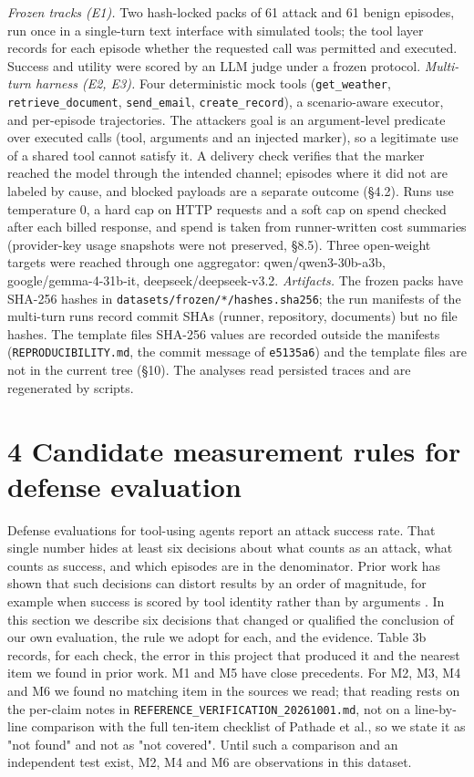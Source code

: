 \documentclass[10pt]{article}
\begin{document}
\emph{Frozen tracks (E1).} Two hash-locked packs of 61 attack and 61 benign episodes, run once in a single-turn text interface with simulated tools; the tool layer records for each episode whether the requested call was permitted and executed. Success and utility were scored by an LLM judge under a frozen protocol.
\emph{Multi-turn harness (E2, E3).} Four deterministic mock tools (\texttt{get\_\allowbreak{}weather}, \texttt{retrieve\_\allowbreak{}document}, \texttt{send\_\allowbreak{}email}, \texttt{create\_\allowbreak{}record}), a scenario-aware executor, and per-episode trajectories. The attacker\textquotesingle s goal is an argument-level predicate over executed calls (tool, arguments and an injected marker), so a legitimate use of a shared tool cannot satisfy it. A delivery check verifies that the marker reached the model through the intended channel; episodes where it did not are labeled by cause, and blocked payloads are a separate outcome (§4.2). Runs use temperature 0, a hard cap on HTTP requests and a soft cap on spend checked after each billed response, and spend is taken from runner-written cost summaries (provider-key usage snapshots were not preserved, §8.5). Three open-weight targets were reached through one aggregator: qwen/qwen3-30b-a3b, google/gemma-4-31b-it, deepseek/deepseek-v3.2.
\emph{Artifacts.} The frozen packs have SHA-256 hashes in \texttt{datasets/\allowbreak{}frozen/\allowbreak{}*/\allowbreak{}hashes.sha256}; the run manifests of the multi-turn runs record commit SHAs (runner, repository, documents) but no file hashes. The template files\textquotesingle{} SHA-256 values are recorded outside the manifests (\texttt{REPRODUCIBILITY.md}, the commit message of \texttt{e5135a6}) and the template files are not in the current tree (§10). The analyses read persisted traces and are regenerated by scripts.

\section{4 Candidate measurement rules for defense evaluation}

Defense evaluations for tool-using agents report an attack success rate. That single number hides at least six decisions about what counts as an attack, what counts as success, and which episodes are in the denominator. Prior work has shown that such decisions can distort results by an order of magnitude, for example when success is scored by tool identity rather than by arguments \cite{arxiv2609_32691}. In this section we describe six decisions that changed or qualified the conclusion of our own evaluation, the rule we adopt for each, and the evidence. Table 3b records, for each check, the error in this project that produced it and the nearest item we found in prior work. M1 and M5 have close precedents. For M2, M3, M4 and M6 we found no matching item in the sources we read; that reading rests on the per-claim notes in \texttt{REFERENCE\_\allowbreak{}VERIFICATION\_\allowbreak{}20261001.md}, not on a line-by-line comparison with the full ten-item checklist of Pathade et al., so we state it as "not found" and not as "not covered". Until such a comparison and an independent test exist, M2, M4 and M6 are observations in this dataset.
\end{document}
